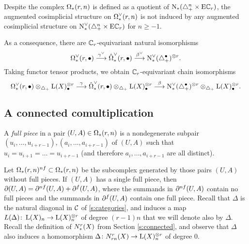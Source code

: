 \begin{remark}
	Despite the complex $\Om(r,n)$ is defined as a quotient of $\chains(\asimplex^n\times \EC_r)$, the augmented cosimplicial structure on $\Omd(r,n)$ is not induced by any augmented cosimplicial structure on $\cochains(\asimplex^n\times \EC_r)$ for $n\geq -1$.
\end{remark}
As a consequence, there are $\Cyc_r$-equivariant natural isomorphisms
\[\Omd(r,\bullet)\overset{\gamma^\dd}{\lra} \Omhatd(r,\bullet)\overset{\beta^\dd}{\lra} \cochains(\asimplex^\bullet)^{\otimes r}.\]
Taking functor tensor products, we obtain $\Cyc_r$-equivariant chain isomorphisms
\[\Omd(r,\bullet)\otimes_{\asimplex} \rA(X)_\bullet^{\otimes r}\overset{\gamma}{\lra} \Omhatd(r,\bullet)\otimes_{\asimplex} \rA(X)_\bullet^{\otimes r}\overset{\beta}{\lra} \cochains(\asimplex^\bullet)^{\otimes r}\otimes_{\asimplex} \rA(X)_\bullet^{\otimes r}.\]




\subsection{A connected comultiplication}\label{s:mainresult} A \emph{full piece} in a pair $(U,A)\in \Om(r,n)$ is a nondegenerate subpair $(u_i,\ldots,u_{i+r-1}),(a_i,\ldots,a_{i+r-1})$ of $(U,A)$ such that $u_i = u_{i+1} = \ldots = u_{i+r-1}$ (and therefore $a_i,\ldots,a_{i+r-1}$ are all distinct).

Let $\Om(r,n)^{\nf}\subset \Om(r,n)$ be the subcomplex generated by those pairs $(U,A)$ without full pieces. If $(U,A)$ has a single full piece, then $\partial(U,A) = \partial^{\nf}(U,A) + \partial^{\f}(U,A)$, where the summands in $\partial^{\nf}(U,A)$ contain no full pieces and the summands in $\partial^{\f}(U,A)$ contain one full piece. Recall that $\Delta$ is the natural diagonal in $\cC$ of \ref{s:categories}, and induces a map $L(\Delta)\colon \rA(X)_n\to \rA(X)_n^{\otimes r}$ of degree $(r-1)n$ that we will denote also by $\Delta$. Recall the definition of $\rcadenas(X)$ from Section \ref{s:connected}, and observe that $\Delta$ also induces a homomorphism $\Delta\colon \rcadenas[rn](X)\to \rA(X)_n^{\otimes r}$ of degree $0$.

\renewcommand{\Psiom}{\Psi}

